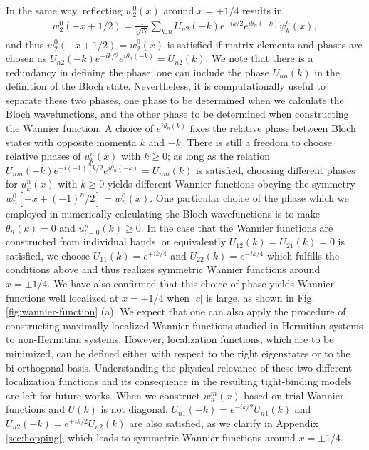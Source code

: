 \documentclass[prb,superscriptaddress,floatfix,twocolumn,showpacs]{revtex4-2}
\begin{document}
In the same way, reflecting $w_2^0(x)$ around $x=+1/4$ results in
\begin{align}
    w_2^0(-x+1/2)=
    \frac{1}{\sqrt{N}}\sum_{k,n} U_{n2}(-k) e^{-ik/2} e^{i\theta_n(-k)} \psi_k^n (x),
    \label{eq:symmetric_w2}
\end{align}
and thus $w_2^0(-x+1/2)=w_2^0(x)$ is satisfied if matrix elements and phases are chosen as $U_{n2}(-k) e^{-ik/2} e^{i\theta_n(-k)} = U_{n2}(k)$. 
We note that there is a redundancy in defining the phase; one can include the phase $U_{nn}(k)$ in the definition of the Bloch state. 
Nevertheless, it is computationally useful to separate these two phases, one phase to be determined when we calculate the Bloch wavefunctions, and the other phase to be determined when constructing the Wannier function.
A choice of $e^{i\theta_n(k)}$ fixes the relative phase between Bloch states with opposite momenta $k$ and $-k$. 
There is still a freedom to choose relative phases of $u_k^n(x)$ with $k \ge 0$; as long as the relation $U_{nm}(-k) e^{-i(-1)^mk/2} e^{i\theta_n(-k)} = U_{nm}(k)$ is satisfied, choosing different phases for $u_k^n(x)$ with $k \ge 0$ yields different Wannier functions obeying the symmetry $w_n^0[-x+(-1)^n/2] = w_n^0 (x)$. 
One particular choice of the phase which we employed in numerically calculating the Bloch wavefunctions is to make $\theta_n(k) = 0$ and $u_{l=0}^n(k) \ge 0$. 
In the case that the Wannier functions are constructed from individual bands, or equivalently  $U_{12}(k)=U_{21}(k)=0$ is satisfied, we choose $U_{11}(k)=e^{+ik/4}$ and $U_{22}(k)=e^{-ik/4}$ which fulfills the conditions above and thus realizes symmetric Wannier functions around $x=\pm1/4$. 
We have also confirmed that this choice of phase yields Wannier functions well localized at $x = \pm1/4$ when $|c|$ is large, as shown in Fig. \ref{fig:wannier-function} (a). 
We expect that one can also apply the procedure of constructing maximally localized Wannier functions studied in Hermitian systems  \cite{marzani2012maximally,
marzani1997maximally,
souza2001maximally} to non-Hermitian systems. 
However, localization functions, which are to be minimized, can be defined either with respect to the right eigenstates or to the bi-orthogonal basis. 
Understanding the physical relevance of these two different localization functions and its consequence in the resulting tight-binding models are left for future works. 
When we construct $w_n^m(x)$ based on trial Wannier functions and $U(k)$ is not diagonal, $U_{n1}(-k)=e^{-ik/2}U_{n1}(k)$ and $U_{n2}(-k)=e^{+ik/2}U_{n2}(k)$ are also satisfied, as we clarify in Appendix \ref{sec:hopping}, which leads to symmetric Wannier functions around $x=\pm1/4$.
\end{document}
